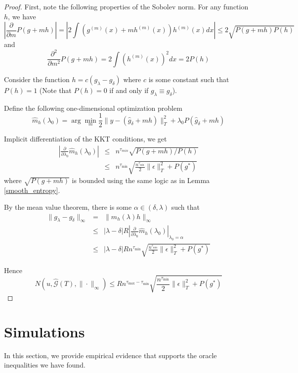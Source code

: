 \documentclass[12pt]{article}
\begin{document}
\begin{proof}
First, note the following properties of the Sobolev norm. For any function $h$, we have
\[
\left | \frac{\partial}{\partial m}P(g+mh) \right | = \left | 2\int(g^{(m)}(x)+mh^{(m)}(x))h^{(m)}(x)dx \right | \le 2\sqrt{P(g+mh)P(h)}
\]
and 
\[
\frac{\partial^{2}}{\partial m^{2}}P(g+mh)=2\int(h^{(m)}(x))^{2}dx=2P(h)
\]

Consider the function $h=c(g_{\lambda}-g_{\delta})$ where $c$ is some constant such that $P(h) = 1$ (Note that $P(h) = 0$ if and only if $g_{\lambda} \equiv g_{\delta}$).

Define the following one-dimensional optimization problem
\[
\hat{m}_{h}(\lambda_0)=\arg\min_{m}\frac{1}{2}\|y-(\hat{g}_{\delta}+mh)\|_{T}^{2}+\lambda_0 P(\hat{g}_{\delta}+mh)
\]

Implicit differentiation of the KKT conditions, we get
\begin{eqnarray*}
\left|\frac{\partial}{\partial\lambda_0}\hat{m}_{h}(\lambda_0)\right| & \le & n^{\tau_{min}}\sqrt{P(g+mh) / P(h)}\\
 & \le & n^{\tau_{\min}}\sqrt{ \frac{n^{\tau_{\min}}}{2} \|\epsilon \|_T^2 +  P(g^*)}
\end{eqnarray*}
where $\sqrt{P(g+mh)}$ is bounded using the same logic as in Lemma \ref{smooth_entropy}.

By the mean value theorem, there is some $\alpha \in (\delta, \lambda)$ such that
\begin{eqnarray*}
\|g_{\lambda}-g_{\delta}\|_{\infty} & = & \|\hat{m}_{h}(\lambda)h\|_{\infty}\\
 & \le & |\lambda-\delta| R \left|\frac{\partial}{\partial\lambda_0}\hat{m}_{h}(\lambda_0)\right|_{\lambda_0 = \alpha}\\
 & \le & |\lambda-\delta| R n^{\tau_{\min}}\sqrt{ \frac{n^{\tau_{\min}}}{2} \|\epsilon \|_T^2 +  P(g^*)}
\end{eqnarray*}

Hence
\[
N\left(u,\hat{\mathcal{G}}(T),\|\cdot\|_{\infty}\right)\le R n^{\tau_{\max} - \tau_{\min}}\sqrt{ \frac{n^{\tau_{\min}}}{2} \|\epsilon \|_T^2 +  P(g^*)}
\]
\end{proof}

\section{Simulations}\label{sec:simulations}

In this section, we provide empirical evidence that supports the oracle inequalities we have found.
\end{document}
